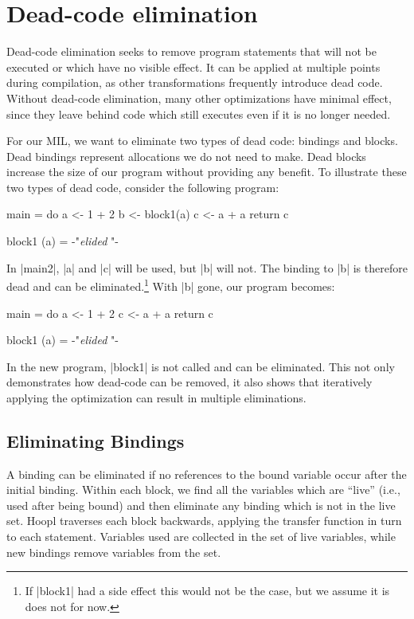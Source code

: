 \documentclass[12pt]{report}
\begin{document}


\chapter{Dead-code elimination}

Dead-code elimination seeks to remove program statements that will not
be executed or which have no visible effect. It can be applied at
multiple points during compilation, as other transformations
frequently introduce dead code. Without dead-code elimination, many
other optimizations have minimal effect, since they leave behind code
which still executes even if it is no longer needed.

For our MIL, we want to eliminate two types of dead code: bindings and
blocks. Dead bindings represent allocations we do not need to
make. Dead blocks increase the size of our program without providing
any benefit. To illustrate these two types of dead code, consider
the following program:

\begin{code}
main = do
  a <- 1 + 2
  b <- block1(a)
  c <- a + a
  return c

block1 (a) = {-"\mathellipsis \emph{elided} \mathellipsis"-}
\end{code}

In |main2|, |a| and |c| will be used, but |b| will not. The binding to
|b| is therefore dead and can be eliminated.\footnote{If |block1| had
  a side effect this would not be the case, but we assume it is does
  not for now.} With |b| gone, our program becomes:

\begin{code}
main = do
  a <- 1 + 2
  c <- a + a
  return c

block1 (a) = {-"\mathellipsis \emph{elided} \mathellipsis"-}
\end{code}

In the new program, |block1| is not called and can be eliminated. This
not only demonstrates how dead-code can be removed, it also shows that
iteratively applying the optimization can result in multiple
eliminations.

\section{Eliminating Bindings}
\label{dead_sub_elim_bindings}

A binding can be eliminated if no references to the bound variable
occur after the initial binding. Within each block, we find all the
variables which are ``live'' (i.e., used after being bound) and then
eliminate any binding which is not in the live set. 
Hoopl traverses each block backwards, applying the transfer function in turn to each statement. 
Variables used are collected in the set of live
variables, while new bindings remove variables from the set. 
\end{document}
